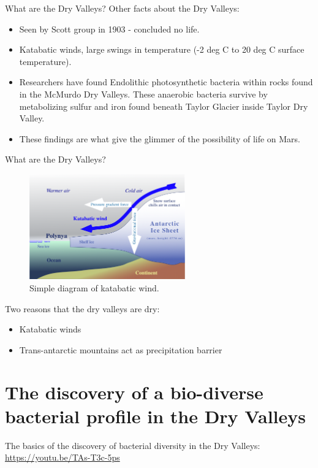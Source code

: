 \documentclass{beamer}
\begin{document}
\begin{frame}{What are the Dry Valleys?}
Other facts about the Dry Valleys:
\begin{itemize}
\item Seen by Scott group in 1903 - concluded no life.
\item Katabatic winds, large swings in temperature (-2 deg C to 20 deg C surface temperature).
\item Researchers have found Endolithic photosynthetic bacteria within rocks found in the McMurdo Dry Valleys. These anaerobic bacteria survive by metabolizing sulfur and iron found beneath Taylor Glacier inside Taylor Dry Valley. 
\item These findings are what give the glimmer of the possibility of life on Mars.
\end{itemize}
\end{frame}

\begin{frame}{What are the Dry Valleys?}
\begin{figure}
\centering
\includegraphics[width=0.6\textwidth]{kat.png}
\caption{\label{fig:kat} Simple diagram of katabatic wind.}
\end{figure}
\small
Two reasons that the dry valleys are dry:
\begin{itemize}
\item Katabatic winds
\item Trans-antarctic mountains act as precipitation barrier
\end{itemize}
\end{frame}

\section{The discovery of a bio-diverse bacterial profile in the Dry Valleys}

\begin{frame}
The basics of the discovery of bacterial diversity in the Dry Valleys:
\url{https://youtu.be/TAs-T3c-5ps}
\end{frame}
\end{document}

